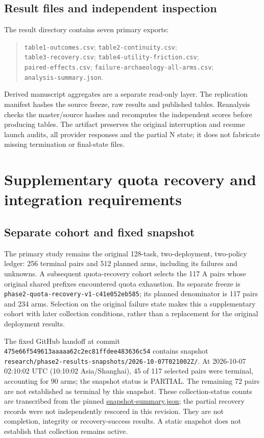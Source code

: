 \documentclass[11pt,a4paper]{article}
\newcommand{\code}[1]{\nolinkurl{#1}}
\begin{document}
\subsection{Result files and independent inspection}
The result directory contains seven primary exports:
\begin{quote}\small
\code{table1-outcomes.csv}; \code{table2-continuity.csv};\\
\code{table3-recovery.csv}; \code{table4-utility-friction.csv};\\
\code{paired-effects.csv}; \code{failure-archaeology-all-arms.csv};\\
\code{analysis-summary.json}.
\end{quote}
Derived manuscript aggregates are a separate read-only layer. The replication manifest hashes the source freeze, raw results and published tables. Reanalysis checks the master/source hashes and recomputes the independent scores before producing tables. The artifact preserves the original interruption and resume launch audits, all provider responses and the partial N state; it does not fabricate missing termination or final-state files.

\section{Supplementary quota recovery and integration requirements}
\label{app:quota-recovery}
\subsection{Separate cohort and fixed snapshot}
The primary study remains the original 128-task, two-deployment, two-policy ledger: 256 terminal pairs and 512 planned arms, including its failures and unknowns. A subsequent quota-recovery cohort selects the 117 A pairs whose original shared prefixes encountered quota exhaustion. Its separate freeze is \code{phase2-quota-recovery-v1-c41e052eb585}; its planned denominator is 117 pairs and 234 arms. Selection on the original failure state makes this a supplementary cohort with later collection conditions, rather than a replacement for the original deployment results.

The fixed GitHub handoff at commit \code{475e66f549613aaaaa62c2ec81ffdee483636c54} contains snapshot \code{research/phase2-results-snapshots/2026-10-07T021002Z/}. At 2026-10-07 02:10:02 UTC (10:10:02 Asia/Shanghai), 45 of 117 selected pairs were terminal, accounting for 90 arms; the snapshot status is PARTIAL. The remaining 72 pairs are not established as terminal by this snapshot. These collection-status counts are transcribed from the pinned \href{https://github.com/lhh666-6/auto-dete/blob/475e66f549613aaaaa62c2ec81ffdee483636c54/research/phase2-results-snapshots/2026-10-07T021002Z/snapshot-summary.json}{snapshot-summary.json}; the partial recovery records were not independently rescored in this revision. They are not completion, integrity or recovery-success results. A static snapshot does not establish that collection remains active.
\end{document}
